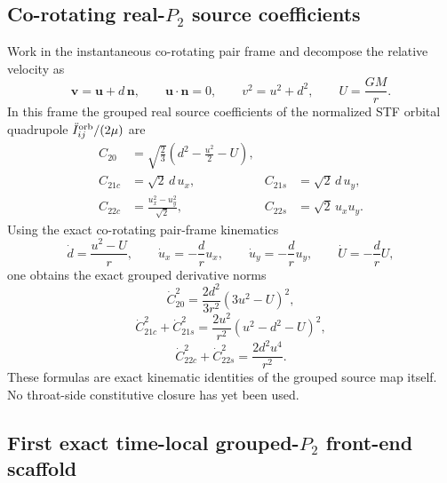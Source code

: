 \documentclass[11pt]{article}
\begin{document}
\subsection{Co-rotating real-\texorpdfstring{$P_2$}{P 2} source coefficients}
\label{app:grouped-p2-target-pack-corotating}

Work in the instantaneous co-rotating pair frame and decompose the relative
velocity as
\begin{equation}
 \mathbf v=\mathbf u+d\,\mathbf n,
 \qquad
 \mathbf u\!\cdot\!\mathbf n=0,
 \qquad
 v^2=u^2+d^2,
 \qquad
 U=\frac{GM}{r}.
\label{eq:app-grouped-p2-target-pack-pair-frame}
\end{equation}
In this frame the grouped real source coefficients of the normalized STF orbital
quadrupole
\(\ddot I_{ij}^{\rm orb}/(2\mu)\)
are
\begin{align}
 C_{20}&=\sqrt{\frac23}\left(d^2-\frac{u^2}{2}-U\right),
\label{eq:app-grouped-p2-target-pack-C20}
\\[0.5ex]
 C_{21c}&=\sqrt2\,d\,u_x,
 & C_{21s}&=\sqrt2\,d\,u_y,
\label{eq:app-grouped-p2-target-pack-C21}
\\[0.5ex]
 C_{22c}&=\frac{u_x^2-u_y^2}{\sqrt2},
 & C_{22s}&=\sqrt2\,u_xu_y.
\label{eq:app-grouped-p2-target-pack-C22}
\end{align}
Using the exact co-rotating pair-frame kinematics
\begin{equation}
 \dot d=\frac{u^2-U}{r},
 \qquad
 \dot u_x=-\frac{d}{r}u_x,
 \qquad
 \dot u_y=-\frac{d}{r}u_y,
 \qquad
 \dot U=-\frac{d}{r}U,
\label{eq:app-grouped-p2-target-pack-corotating-kinematics}
\end{equation}
one obtains the exact grouped derivative norms
\begin{equation}
 \dot C_{20}^2=\frac{2d^2}{3r^2}(3u^2-U)^2,
\label{eq:app-grouped-p2-target-pack-dotC20}
\end{equation}
\begin{equation}
 \dot C_{21c}^2+\dot C_{21s}^2
 =\frac{2u^2}{r^2}(u^2-d^2-U)^2,
\label{eq:app-grouped-p2-target-pack-dotC21}
\end{equation}
\begin{equation}
 \dot C_{22c}^2+\dot C_{22s}^2
 =\frac{2d^2u^4}{r^2}.
\label{eq:app-grouped-p2-target-pack-dotC22}
\end{equation}
These formulas are exact kinematic identities of the grouped source map itself.
No throat-side constitutive closure has yet been used.

\subsection{First exact time-local grouped-\texorpdfstring{$P_2$}{P 2} front-end scaffold}
\label{app:grouped-p2-target-pack-front-end}
\end{document}
